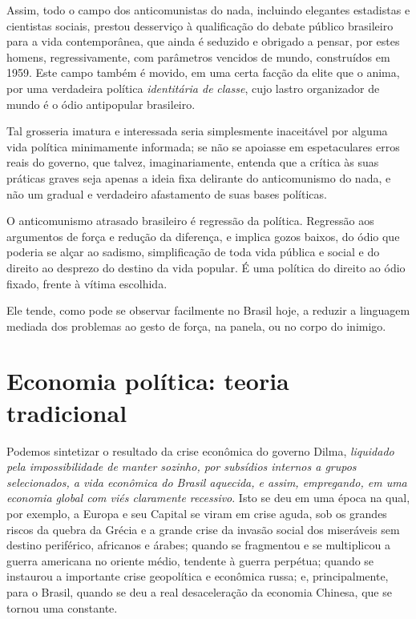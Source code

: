 Assim, todo o campo dos anticomunistas do nada, incluindo elegantes
estadistas e cientistas sociais, prestou desserviço à qualificação do
debate público brasileiro para a vida contemporânea, que ainda é
seduzido e obrigado a pensar, por estes homens, regressivamente, com
parâmetros vencidos de mundo, construídos em 1959. Este campo também é
movido, em uma certa facção da elite que o anima, por uma verdadeira
política \emph{identitária de} \emph{classe}, cujo lastro organizador de
mundo é o ódio antipopular brasileiro. 

Tal grosseria imatura e interessada seria simplesmente inaceitável por
alguma vida política minimamente informada; se não se apoiasse em
espetaculares erros reais do governo, que talvez, imaginariamente,
entenda que a crítica às suas práticas graves seja apenas a ideia fixa
delirante do anticomunismo do nada, e não um gradual e verdadeiro
afastamento de suas bases políticas.

O anticomunismo atrasado brasileiro é regressão da política. Regressão
aos argumentos de força e redução da diferença, e implica gozos baixos,
do ódio que poderia se alçar ao sadismo, simplificação de toda vida
pública e social e do direito ao desprezo do destino da vida
popular. É uma política do direito ao ódio fixado, frente à vítima
escolhida.

Ele tende, como pode se observar facilmente no Brasil hoje, a reduzir a
linguagem mediada dos problemas ao gesto de força, na panela, ou no
corpo do inimigo.

  \section{Economia política: teoria
  tradicional}\label{economia-poluxedtica-teoria-tradicional}

Podemos sintetizar o resultado da crise econômica do governo Dilma, 
\emph{liquidado pela impossibilidade de manter sozinho, por subsídios internos a grupos
selecionados, a vida econômica do Brasil aquecida, e assim, empregando, em uma
economia global com viés claramente recessivo}. Isto se deu em uma época na qual,
por exemplo, a Europa e seu Capital se viram em crise aguda, sob os grandes
riscos da quebra da Grécia e a grande crise da invasão social dos miseráveis sem
destino periférico, africanos e árabes; quando se fragmentou e se multiplicou a
guerra americana no oriente médio, tendente à guerra perpétua; quando se
instaurou a importante crise geopolítica e econômica russa; e, principalmente,
para o Brasil, quando se deu a real desaceleração da economia Chinesa, que se
tornou uma constante. 

